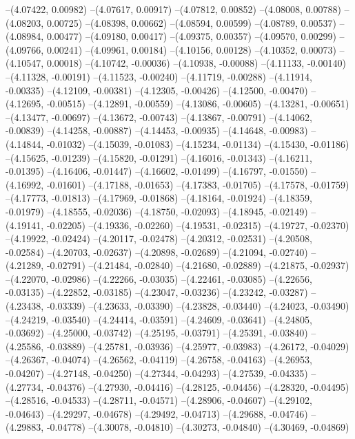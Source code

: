 --(4.07422, 0.00982)
--(4.07617, 0.00917)
--(4.07812, 0.00852)
--(4.08008, 0.00788)
--(4.08203, 0.00725)
--(4.08398, 0.00662)
--(4.08594, 0.00599)
--(4.08789, 0.00537)
--(4.08984, 0.00477)
--(4.09180, 0.00417)
--(4.09375, 0.00357)
--(4.09570, 0.00299)
--(4.09766, 0.00241)
--(4.09961, 0.00184)
--(4.10156, 0.00128)
--(4.10352, 0.00073)
--(4.10547, 0.00018)
--(4.10742, -0.00036)
--(4.10938, -0.00088)
--(4.11133, -0.00140)
--(4.11328, -0.00191)
--(4.11523, -0.00240)
--(4.11719, -0.00288)
--(4.11914, -0.00335)
--(4.12109, -0.00381)
--(4.12305, -0.00426)
--(4.12500, -0.00470)
--(4.12695, -0.00515)
--(4.12891, -0.00559)
--(4.13086, -0.00605)
--(4.13281, -0.00651)
--(4.13477, -0.00697)
--(4.13672, -0.00743)
--(4.13867, -0.00791)
--(4.14062, -0.00839)
--(4.14258, -0.00887)
--(4.14453, -0.00935)
--(4.14648, -0.00983)
--(4.14844, -0.01032)
--(4.15039, -0.01083)
--(4.15234, -0.01134)
--(4.15430, -0.01186)
--(4.15625, -0.01239)
--(4.15820, -0.01291)
--(4.16016, -0.01343)
--(4.16211, -0.01395)
--(4.16406, -0.01447)
--(4.16602, -0.01499)
--(4.16797, -0.01550)
--(4.16992, -0.01601)
--(4.17188, -0.01653)
--(4.17383, -0.01705)
--(4.17578, -0.01759)
--(4.17773, -0.01813)
--(4.17969, -0.01868)
--(4.18164, -0.01924)
--(4.18359, -0.01979)
--(4.18555, -0.02036)
--(4.18750, -0.02093)
--(4.18945, -0.02149)
--(4.19141, -0.02205)
--(4.19336, -0.02260)
--(4.19531, -0.02315)
--(4.19727, -0.02370)
--(4.19922, -0.02424)
--(4.20117, -0.02478)
--(4.20312, -0.02531)
--(4.20508, -0.02584)
--(4.20703, -0.02637)
--(4.20898, -0.02689)
--(4.21094, -0.02740)
--(4.21289, -0.02791)
--(4.21484, -0.02840)
--(4.21680, -0.02889)
--(4.21875, -0.02937)
--(4.22070, -0.02986)
--(4.22266, -0.03035)
--(4.22461, -0.03085)
--(4.22656, -0.03135)
--(4.22852, -0.03185)
--(4.23047, -0.03236)
--(4.23242, -0.03287)
--(4.23438, -0.03339)
--(4.23633, -0.03390)
--(4.23828, -0.03440)
--(4.24023, -0.03490)
--(4.24219, -0.03540)
--(4.24414, -0.03591)
--(4.24609, -0.03641)
--(4.24805, -0.03692)
--(4.25000, -0.03742)
--(4.25195, -0.03791)
--(4.25391, -0.03840)
--(4.25586, -0.03889)
--(4.25781, -0.03936)
--(4.25977, -0.03983)
--(4.26172, -0.04029)
--(4.26367, -0.04074)
--(4.26562, -0.04119)
--(4.26758, -0.04163)
--(4.26953, -0.04207)
--(4.27148, -0.04250)
--(4.27344, -0.04293)
--(4.27539, -0.04335)
--(4.27734, -0.04376)
--(4.27930, -0.04416)
--(4.28125, -0.04456)
--(4.28320, -0.04495)
--(4.28516, -0.04533)
--(4.28711, -0.04571)
--(4.28906, -0.04607)
--(4.29102, -0.04643)
--(4.29297, -0.04678)
--(4.29492, -0.04713)
--(4.29688, -0.04746)
--(4.29883, -0.04778)
--(4.30078, -0.04810)
--(4.30273, -0.04840)
--(4.30469, -0.04869)
